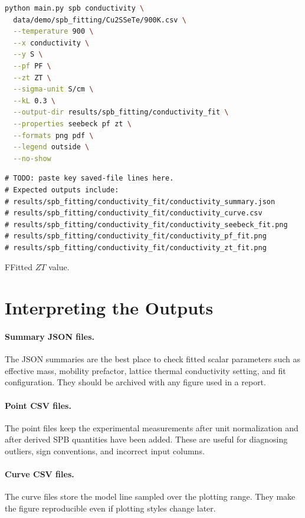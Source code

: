 \begin{lstlisting}[language=bash,caption={Command slot: conductivity-axis SPB fit.}]
python main.py spb conductivity \
  data/demo/spb_fitting/Cu2SSeTe/900K.csv \
  --temperature 900 \
  --x conductivity \
  --y S \
  --pf PF \
  --zt ZT \
  --sigma-unit S/cm \
  --kL 0.3 \
  --output-dir results/spb_fitting/conductivity_fit \
  --properties seebeck pf zt \
  --formats png pdf \
  --legend outside \
  --no-show
\end{lstlisting}

\begin{lstlisting}[caption={Terminal-output slot: conductivity-axis fit.}]
# TODO: paste key saved-file lines here.
# Expected outputs include:
# results/spb_fitting/conductivity_fit/conductivity_summary.json
# results/spb_fitting/conductivity_fit/conductivity_curve.csv
# results/spb_fitting/conductivity_fit/conductivity_seebeck_fit.png
# results/spb_fitting/conductivity_fit/conductivity_pf_fit.png
# results/spb_fitting/conductivity_fit/conductivity_zt_fit.png
\end{lstlisting}


{FFitted $ZT$ value.}

\section{Interpreting the Outputs}

\paragraph{Summary JSON files.}
The JSON summaries are the best place to check fitted scalar parameters such as
effective mass, mobility prefactor, lattice thermal conductivity setting, and
fit configuration. They should be archived with any figure used in a report.

\paragraph{Point CSV files.}
The point files keep the experimental measurements after unit normalization and
after derived SPB quantities have been added. These are useful for diagnosing
outliers, sign conventions, and incorrect input columns.

\paragraph{Curve CSV files.}
The curve files store the model line sampled over the plotting range. They make
the figure reproducible even if plotting styles change later.

